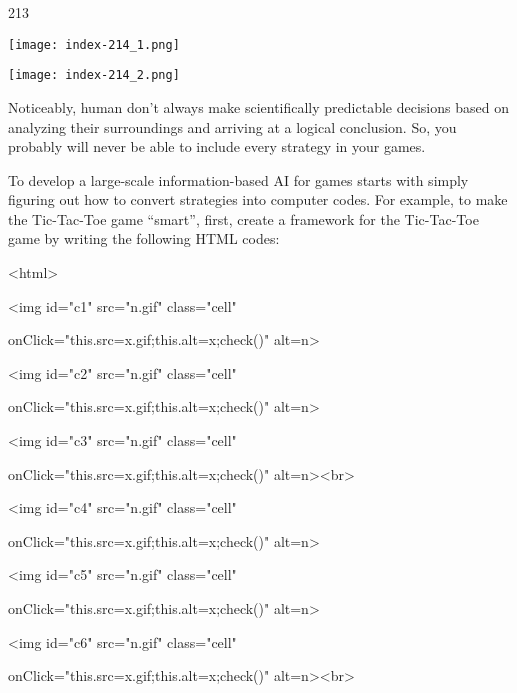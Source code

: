 \documentclass[
]{article}
\begin{document}
213

\protect\hypertarget{index_split_011.htmlux5cux23p214}{}{}\texttt{[image: index-214\_1.png]}

\texttt{[image: index-214\_2.png]}

Noticeably, human don't always make scientifically predictable decisions
based on analyzing their surroundings and arriving at a logical
conclusion. So, you probably will never be able to include every
strategy in your games.

To develop a large-scale information-based AI for games starts with
simply figuring out how to convert strategies into computer codes. For
example, to make the Tic-Tac-Toe game ``smart'', first, create a
framework for the Tic-Tac-Toe game by writing the following HTML codes:

\textless html\textgreater{}

\textless img id="c1" src="n.gif" class="cell"

onClick="this.src=\textquotesingle x.gif\textquotesingle;this.alt=\textquotesingle x\textquotesingle;check()"
alt=\textquotesingle n\textquotesingle\textgreater{}

\textless img id="c2" src="n.gif" class="cell"

onClick="this.src=\textquotesingle x.gif\textquotesingle;this.alt=\textquotesingle x\textquotesingle;check()"
alt=\textquotesingle n\textquotesingle\textgreater{}

\textless img id="c3" src="n.gif" class="cell"

onClick="this.src=\textquotesingle x.gif\textquotesingle;this.alt=\textquotesingle x\textquotesingle;check()"
alt=\textquotesingle n\textquotesingle\textgreater\textless br\textgreater{}

\textless img id="c4" src="n.gif" class="cell"

onClick="this.src=\textquotesingle x.gif\textquotesingle;this.alt=\textquotesingle x\textquotesingle;check()"
alt=\textquotesingle n\textquotesingle\textgreater{}

\textless img id="c5" src="n.gif" class="cell"

onClick="this.src=\textquotesingle x.gif\textquotesingle;this.alt=\textquotesingle x\textquotesingle;check()"
alt=\textquotesingle n\textquotesingle\textgreater{}

\textless img id="c6" src="n.gif" class="cell"

onClick="this.src=\textquotesingle x.gif\textquotesingle;this.alt=\textquotesingle x\textquotesingle;check()"
alt=\textquotesingle n\textquotesingle\textgreater\textless br\textgreater{}
\end{document}
